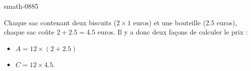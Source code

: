 
\begin{corrige}{smath-0885}

    Chaque sac contenant deux biscuits (\( 2\times 1\) euros) et une bouteille (\( 2.5\) euros), chaque sac coûte \( 2+2.5=4.5\) euros. Il y a donc deux façons de calculer le prix :
    \begin{itemize}
        \item
            \( A=12\times (2+2.5)\)
        \item
            \( C=12\times 4.5\).
    \end{itemize}

\end{corrige}
